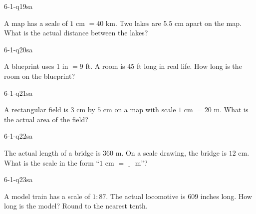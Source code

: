 
\begin{practiceQuestion}{6-1-q19}{sa}
\begin{questionText}
A map has a scale of $1$ cm $= 40$ km. Two lakes are $5.5$ cm apart on the map. What is the actual distance between the lakes?
\end{questionText}
\end{practiceQuestion}

\begin{practiceQuestion}{6-1-q20}{sa}
\begin{questionText}
A blueprint uses $1$ in $= 9$ ft. A room is $45$ ft long in real life. How long is the room on the blueprint?
\end{questionText}
\end{practiceQuestion}

\begin{practiceQuestion}{6-1-q21}{sa}
\begin{questionText}
A rectangular field is $3$ cm by $5$ cm on a map with scale $1$ cm $= 20$ m. What is the actual area of the field?
\end{questionText}
\end{practiceQuestion}

\begin{practiceQuestion}{6-1-q22}{sa}
\begin{questionText}
The actual length of a bridge is $360$ m. On a scale drawing, the bridge is $12$ cm. What is the scale in the form ``$1$ cm $= \underline{\quad}$ m''?
\end{questionText}
\end{practiceQuestion}

\begin{practiceQuestion}{6-1-q23}{sa}
\begin{questionText}
A model train has a scale of $1:87$. The actual locomotive is $609$ inches long. How long is the model? Round to the nearest tenth.
\end{questionText}
\end{practiceQuestion}

